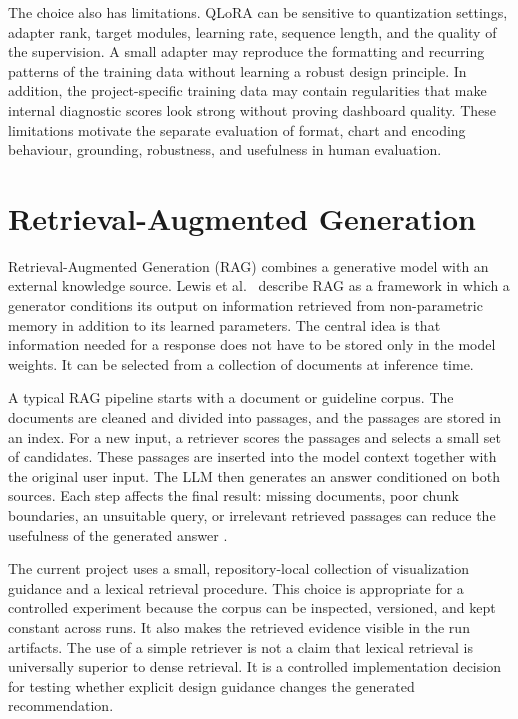 The choice also has limitations. QLoRA can be sensitive to quantization settings, adapter rank, target modules, learning rate, sequence length, and the quality of the supervision. A small adapter may reproduce the formatting and recurring patterns of the training data without learning a robust design principle. In addition, the project-specific training data may contain regularities that make internal diagnostic scores look strong without proving dashboard quality. These limitations motivate the separate evaluation of format, chart and encoding behaviour, grounding, robustness, and usefulness in human evaluation.

\section{Retrieval-Augmented Generation}

Retrieval-Augmented Generation (RAG) combines a generative model with an external knowledge source. Lewis et al.~\cite{lewis2020rag} describe RAG as a framework in which a generator conditions its output on information retrieved from non-parametric memory in addition to its learned parameters. The central idea is that information needed for a response does not have to be stored only in the model weights. It can be selected from a collection of documents at inference time.

A typical RAG pipeline starts with a document or guideline corpus. The documents are cleaned and divided into passages, and the passages are stored in an index. For a new input, a retriever scores the passages and selects a small set of candidates. These passages are inserted into the model context together with the original user input. The LLM then generates an answer conditioned on both sources. Each step affects the final result: missing documents, poor chunk boundaries, an unsuitable query, or irrelevant retrieved passages can reduce the usefulness of the generated answer \cite{lewis2020rag}.

The current project uses a small, repository-local collection of visualization guidance and a lexical retrieval procedure. This choice is appropriate for a controlled experiment because the corpus can be inspected, versioned, and kept constant across runs. It also makes the retrieved evidence visible in the run artifacts. The use of a simple retriever is not a claim that lexical retrieval is universally superior to dense retrieval. It is a controlled implementation decision for testing whether explicit design guidance changes the generated recommendation.

